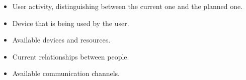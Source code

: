 \begin{itemize}
  \item User activity, distinguishing between the current one and the planned one.
  \item Device that is being used by the user.
  \item Available devices and resources.
  \item Current relationships between people.
  \item Available communication channels.
\end{itemize}


% 
% 
% 

